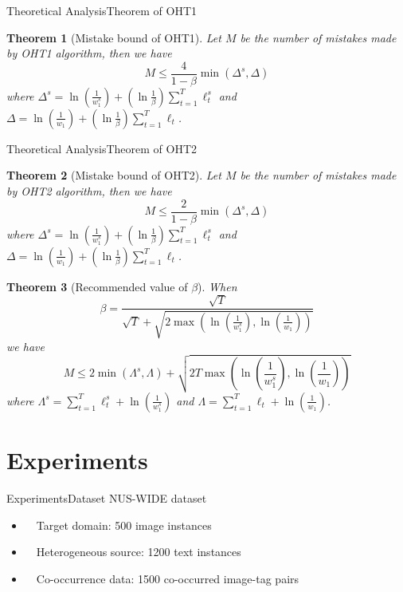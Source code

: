 \documentclass{beamer}
\newtheorem{thm}{Theorem}
\begin{document}
\begin{frame}{Theoretical Analysis}{Theorem of OHT1}
\begin{small}
\begin{thm}[Mistake bound of OHT1]
Let $M$ be the number of mistakes made by OHT1 algorithm, then we have 
$$ M \leq \frac{4}{1-\beta} \min (\varDelta^s, \varDelta) $$
where
$ \varDelta^s = \ln(\frac{1}{w_{1}^{s}}) + (\ln \frac{1}{\beta}) \sum\limits_{t=1}^{T} \ell_{t}^{s} $ and $ \varDelta = \ln(\frac{1}{w_{1}}) + (\ln \frac{1}{\beta}) \sum\limits_{t=1}^{T} \ell_{t} $.
\end{thm}
\end{small}
\end{frame}

\begin{frame}{Theoretical Analysis}{Theorem of OHT2}
\begin{footnotesize}
\begin{thm}[Mistake bound of OHT2]
Let $M$ be the number of mistakes made by OHT2 algorithm, then we have 
$$ M \leq \frac{2}{1-\beta} \min (\varDelta^s, \varDelta) $$
where
$ \varDelta^s = \ln(\frac{1}{w_{1}^{s}}) + (\ln \frac{1}{\beta}) \sum\limits_{t=1}^{T} \ell_{t}^{s} $ and $ \varDelta = \ln(\frac{1}{w_{1}}) + (\ln \frac{1}{\beta}) \sum\limits_{t=1}^{T} \ell_{t} $.
\end{thm}
\begin{thm}[Recommended value of $\beta$]
When 
$$ \beta = \frac{\sqrt{T}}{\sqrt{T} + \sqrt{2 \max (\ln(\frac{1}{w_{1}^{s}}), \ln(\frac{1}{w_1}))}} $$
we have 
$$ M \leq 2 \min (\varLambda^s, \varLambda) + \sqrt{2T \max (\ln(\frac{1}{w_{1}^{s}}), \ln(\frac{1}{w_1}))} $$
where $\varLambda^s = \sum\limits_{t=1}^{T}\ell_{t}^{s} + \ln(\frac{1}{w_{1}^{s}})$ and $\varLambda = \sum\limits_{t=1}^{T}\ell_{t} + \ln(\frac{1}{w_1})$.
\end{thm}
\end{footnotesize}
\end{frame}

\section{Experiments}
\begin{frame}{Experiments}{Dataset}
NUS-WIDE dataset \\
\begin{itemize}
\item
~~Target domain: 500 image instances
\item
~~Heterogeneous source: 1200 text instances
\item
~~Co-occurrence data: 1500 co-occurred image-tag pairs
\end{itemize}
\end{frame}
\end{document}
